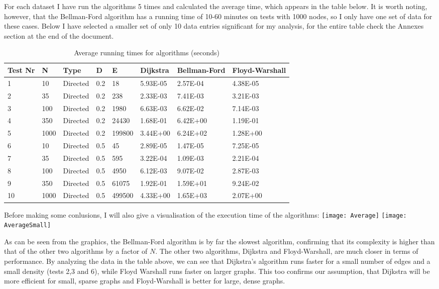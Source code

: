 \documentclass[runningheads]{llncs}
\begin{document}
For each dataset I have run the algorithms 5 times and calculated the average time, which appears in the table below. It is worth noting, however, that the Bellman-Ford algorithm has a running time of 10-60 minutes on tests with 1000 nodes, so I only have one set of data for these cases. Below I have selected a smaller set of only 10 data entries significant for my analysis, for the entire table check the Annexes section at the end of the document.
\begin{table}[!ht]
    \centering
    \caption{Average running times for algorithms (seconds)}
    \begin{tabular}{|l|l|l|l|l|l|l|l|}
    \hline
        \textbf{Test Nr} & \textbf{N} & \textbf{Type} & \textbf{D} & \textbf{E} & \textbf{Dijkstra} & \textbf{Bellman-Ford} & \textbf{Floyd-Warshall} \\ \hline
        1 & 10 & Directed & 0.2 & 18 & 5.93E-05 & 2.57E-04 & 4.38E-05 \\ \hline
        2 & 35 & Directed & 0.2 & 238 & 2.33E-03 & 7.41E-03 & 3.21E-03 \\ \hline
        3 & 100 & Directed & 0.2 & 1980 & 6.63E-03 & 6.62E-02 & 7.14E-03 \\ \hline
        4 & 350 & Directed & 0.2 & 24430 & 1.68E-01 & 6.42E+00 & 1.19E-01 \\ \hline
        5 & 1000 & Directed & 0.2 & 199800 & 3.44E+00 & 6.24E+02 & 1.28E+00 \\ \hline
        6 & 10 & Directed & 0.5 & 45 & 2.89E-05 & 1.47E-05 & 7.25E-05 \\ \hline
        7 & 35 & Directed & 0.5 & 595 & 3.22E-04 & 1.09E-03 & 2.21E-04 \\ \hline
        8 & 100 & Directed & 0.5 & 4950 & 6.12E-03 & 9.07E-02 & 2.87E-03 \\ \hline
        9 & 350 & Directed & 0.5 & 61075 & 1.92E-01 & 1.59E+01 & 9.24E-02 \\ \hline
        10 & 1000 & Directed & 0.5 & 499500 & 4.33E+00 & 1.65E+03 & 2.07E+00 \\ \hline
    \end{tabular}
    \label{Table 2}
\end{table}

Before making some conlusions, I will also give a visualisation of the execution time of the algorithms:
\newline
\texttt{[image: Average]}
\texttt{[image: AverageSmall]}

As can be seen from the graphics, the Bellman-Ford algorithm is by far the slowest algorithm, confirming that its complexity is higher than that of the other two algorithms by a factor of $N$. The other two algorithms, Dijkstra and Floyd-Warshall, are much closer in terms of performance. By analyzing the data in the table above, we can see that Dijkstra's algorithm runs faster for a small number of edges and a small density (tests 2,3 and 6), while Floyd Warshall runs faster on larger graphs. This too confirms our assumption, that Dijkstra will be more efficient for small, sparse graphs and Floyd-Warshall is better for large, dense graphs.
\end{document}
